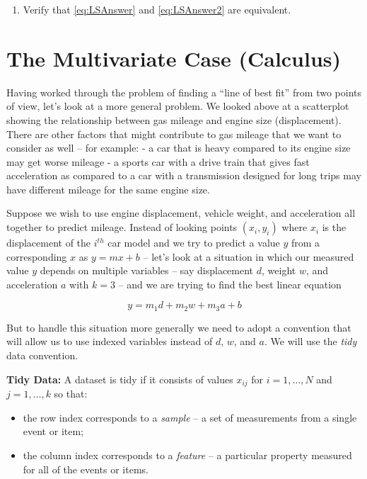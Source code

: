 \documentclass[
  oneside]{scrbook}
\providecommand{\tightlist}{%
  \setlength{\itemsep}{0pt}\setlength{\parskip}{0pt}}
\begin{document}
\begin{enumerate}
\def\labelenumi{\arabic{enumi}.}
\tightlist
\item
  Verify that \cref{eq:LSAnswer} and \cref{eq:LSAnswer2} are equivalent.
\end{enumerate}

\hypertarget{sec:Multivariate-calculus}{%
\section{The Multivariate Case
(Calculus)}\label{sec:Multivariate-calculus}}

Having worked through the problem of finding a ``line of best fit'' from
two points of view, let's look at a more general problem. We looked
above at a scatterplot showing the relationship between gas mileage and
engine size (displacement). There are other factors that might
contribute to gas mileage that we want to consider as well -- for
example: - a car that is heavy compared to its engine size may get worse
mileage - a sports car with a drive train that gives fast acceleration
as compared to a car with a transmission designed for long trips may
have different mileage for the same engine size.

Suppose we wish to use engine displacement, vehicle weight, and
acceleration all together to predict mileage. Instead of looking points
\((x_i,y_i)\) where \(x_i\) is the displacement of the \(i^{th}\) car
model and we try to predict a value \(y\) from a corresponding \(x\) as
\(y=mx+b\) -- let's look at a situation in which our measured value
\(y\) depends on multiple variables -- say displacement \(d\), weight
\(w\), and acceleration \(a\) with \(k=3\) -- and we are trying to find
the best linear equation

\begin{equation} y=m_1 d + m_2 w + m_3 a +b \label{eq:multivariate}\end{equation}

But to handle this situation more generally we need to adopt a
convention that will allow us to use indexed variables instead of \(d\),
\(w\), and \(a\). We will use the \emph{tidy} data convention.

\textbf{Tidy Data:} A dataset is tidy if it consists of values
\(x_{ij}\) for \(i=1,\ldots,N\) and \(j=1,\ldots, k\) so that:

\begin{itemize}
\tightlist
\item
  the row index corresponds to a \emph{sample} -- a set of measurements
  from a single event or item;
\item
  the column index corresponds to a \emph{feature} -- a particular
  property measured for all of the events or items.
\end{itemize}
\end{document}
